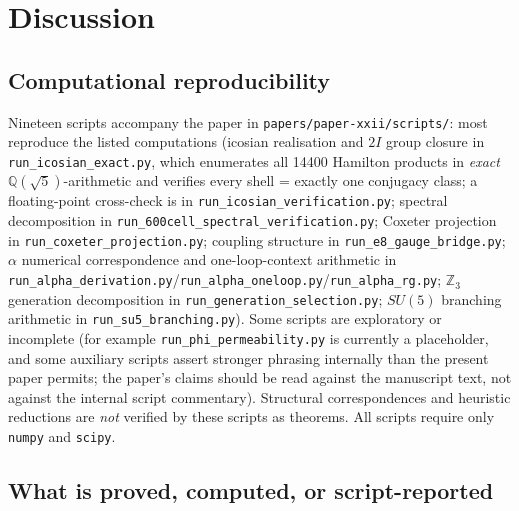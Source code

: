 \documentclass[12pt]{article}
\begin{document}
\section{Discussion}\label{sec:discussion}

\subsection{Computational reproducibility}

Nineteen scripts accompany the paper in \texttt{papers/paper-xxii/scripts/}: most reproduce the listed computations (icosian realisation and $2I$ group closure in \texttt{run\_icosian\_exact.py}, which enumerates all 14400 Hamilton products in \emph{exact} $\mathbb{Q}(\sqrt{5})$-arithmetic and verifies every shell = exactly one conjugacy class; a floating-point cross-check is in \texttt{run\_icosian\_verification.py}; spectral decomposition in \texttt{run\_600cell\_spectral\_verification.py}; Coxeter projection in \texttt{run\_coxeter\_projection.py}; coupling structure in \texttt{run\_e8\_gauge\_bridge.py}; $\alpha$ numerical correspondence and one-loop-context arithmetic in \texttt{run\_alpha\_derivation.py}/\texttt{run\_alpha\_oneloop.py}/\texttt{run\_alpha\_rg.py}; $\mathbb{Z}_3$ generation decomposition in \texttt{run\_generation\_selection.py}; $SU(5)$ branching arithmetic in \texttt{run\_su5\_branching.py}). Some scripts are exploratory or incomplete (for example \texttt{run\_phi\_permeability.py} is currently a placeholder, and some auxiliary scripts assert stronger phrasing internally than the present paper permits; the paper's claims should be read against the manuscript text, not against the internal script commentary). Structural correspondences and heuristic reductions are \emph{not} verified by these scripts as theorems. All scripts require only \texttt{numpy} and \texttt{scipy}.

\subsection{What is proved, computed, or script-reported}
\end{document}
